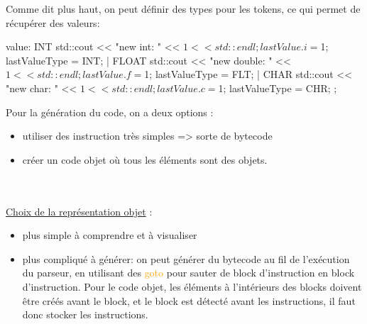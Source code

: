 \documentclass[a4paper]{article}%
\begin{document}
Comme dit plus haut, on peut définir des types pour les tokens, ce qui permet de
récupérer des valeurs:

\begin{code}[language=c++]
value: INT {
       std::cout << "new int: " << $1 << std::endl;
       lastValue.i = $1;
       lastValueType = INT;
     } | FLOAT {
       std::cout << "new double: " << $1 << std::endl;
       lastValue.f = $1;
       lastValueType = FLT;
     } | CHAR {
       std::cout << "new char: " << $1 << std::endl;
       lastValue.c = $1;
       lastValueType = CHR;
     }
     ;
\end{code}\leavevmode\newline

Pour la génération du code, on a deux options :
\begin{itemize}
\item utiliser des instruction très simples => sorte de bytecode
\item créer un code objet où tous les éléments sont des objets.
\end{itemize}\leavevmode\\~\\

\underline{Choix de la représentation objet} :
\begin{itemize}
\item plus simple à comprendre et à visualiser
\item plus compliqué à générer: on peut générer du bytecode au fil de l'exécution du parseur, en utilisant des \textcolor{orange}{goto} pour sauter de block d'instruction en block d'instruction. Pour le code objet, les éléments à l'intérieurs des blocks doivent être créés avant le block, et le block est détecté avant les instructions, il faut donc stocker les instructions.
\end{itemize}


\clearpage{}%

\printbibliography[keyword={paper},title={Biliographie}]
\printbibliography[keyword={web},title={Webographie}]
\end{document}

